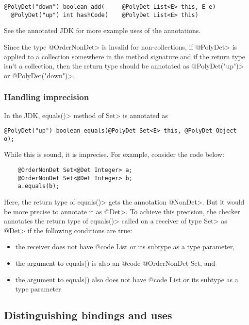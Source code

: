 \begin{Verbatim}
@PolyDet("down") boolean add(     @PolyDet List<E> this, E e)
  @PolyDet("up") int hashCode(    @PolyDet List<E> this)
\end{Verbatim}

See the annotated JDK for more example uses of the annotations.

Since the type \<@OrderNonDet> is invalid for non-collections,
if \<@PolyDet> is applied to a collection somewhere in the method signature
and if the return type isn't a collection, then the return type should be
annotated as \<@PolyDet("up")> or \<@PolyDet("down")>.

\subsubsection{Handling imprecision\label{handling-imprecision}}

In the JDK, \<equals()> method of \<Set> is annotated as
\begin{Verbatim}
@PolyDet("up") boolean equals(@PolyDet Set<E> this, @PolyDet Object o);
\end{Verbatim}
While this is sound, it is imprecise.
For example, consider the code below:

\begin{Verbatim}
    @OrderNonDet Set<@Det Integer> a;
    @OrderNonDet Set<@Det Integer> b;
    a.equals(b);
\end{Verbatim}

Here, the return type of \<equals()> gets the annotation \<@NonDet>.
But it would be more precise to annotate it as \<@Det>.
To achieve this precision, the checker annotates the return type
of \<equals()> called on a receiver of type \<Set> as \<@Det> if the
following conditions are true:
\begin{itemize}
    \item the receiver does not have {@code List} or its subtype as a type parameter,
    \item the argument to equals() is also an {@code @OrderNonDet Set}, and
    \item the argument to equals() also does not have {@code List} or its subtype as a
    type parameter
\end{itemize}

\subsection{Distinguishing bindings and uses\label{determinism-polymorphism-binding}}

